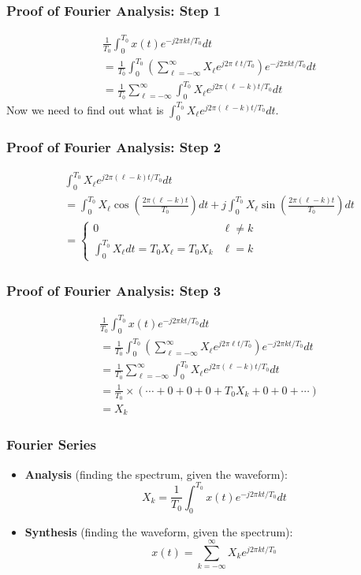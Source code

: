 \documentclass{beamer}
\begin{document}
\begin{frame}
  \frametitle{Proof of Fourier Analysis: Step 1}

  \begin{align*}
    &\frac{1}{T_0}\int_0^{T_0} x(t)e^{-j2\pi kt/T_0}dt\\
    &=\frac{1}{T_0}\int_0^{T_0}\left(\sum_{\ell=-\infty}^\infty X_\ell e^{j2\pi \ell t/T_0}\right)
    e^{-j2\pi kt/T_0}dt\\
    &=\frac{1}{T_0}\sum_{\ell=-\infty}^{\infty}\int_0^{T_0}X_\ell e^{j2\pi (\ell-k) t/T_0}dt
  \end{align*}
  Now we need to find out what is $\int_0^{T_0}X_\ell e^{j2\pi (\ell-k) t/T_0}dt$.
\end{frame}

\begin{frame}
  \frametitle{Proof of Fourier Analysis: Step 2}

  \begin{align*}
    &\int_0^{T_0}X_\ell e^{j2\pi (\ell-k) t/T_0}dt\\
    &= \int_0^{T_0}X_\ell \cos\left(\frac{2\pi (\ell-k) t}{T_0}\right)dt
    + j\int_0^{T_0}X_\ell \sin\left(\frac{2\pi (\ell-k) t}{T_0}\right)dt\\
    &= \begin{cases}0&\ell\ne k\\\int_0^{T_0}X_\ell dt=T_0X_\ell=T_0X_k & \ell =k\end{cases}
  \end{align*}
\end{frame}

\begin{frame}
  \frametitle{Proof of Fourier Analysis: Step 3}

  \begin{align*}
    &\frac{1}{T_0}\int_0^{T_0} x(t)e^{-j2\pi kt/T_0}dt\\
    &=\frac{1}{T_0}\int_0^{T_0}\left(\sum_{\ell=-\infty}^\infty X_\ell e^{j2\pi \ell t/T_0}\right)
    e^{-j2\pi kt/T_0}dt\\
    &=\frac{1}{T_0}\sum_{\ell=-\infty}^{\infty}\int_0^{T_0}X_\ell e^{j2\pi (\ell-k) t/T_0}dt\\
    &=\frac{1}{T_0}\times \left(\cdots+0+0+0+T_0X_k+0+0+\cdots\right)\\
    &= X_k
  \end{align*}
\end{frame}

\begin{frame}
  \frametitle{Fourier Series}

  \begin{itemize}
  \item {\bf Analysis}  (finding the spectrum, given the waveform):
    \[
    X_k = \frac{1}{T_0}\int_0^{T_0} x(t)e^{-j2\pi kt/T_0}dt
    \]
  \item {\bf Synthesis} (finding the waveform, given the spectrum):
    \[
    x(t) = \sum_{k=-\infty}^\infty X_k e^{j2\pi kt/T_0}
    \]
  \end{itemize}
  
\end{frame}  
\end{document}
